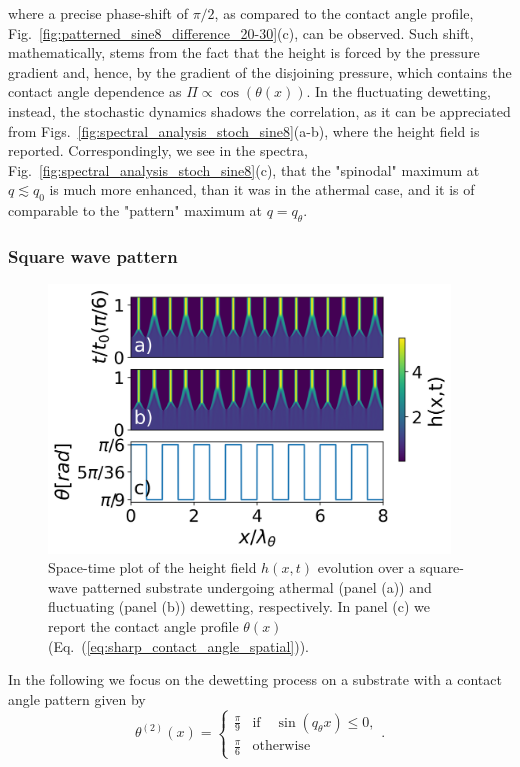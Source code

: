 where a precise phase-shift of $\pi/2$, as compared to the contact angle profile,  Fig.~\ref{fig:patterned_sine8_difference_20-30}(c), can be observed. Such
shift, mathematically, stems from the fact that the height is forced by the pressure gradient and, hence, by the gradient of the disjoining pressure, which contains the contact angle dependence as $\Pi \propto \cos(\theta(x))$.
In the fluctuating dewetting, instead, the stochastic dynamics shadows the correlation,
as it can be appreciated from Figs.~\ref{fig:spectral_analysis_stoch_sine8}(a-b), where 
the height field is reported. 
Correspondingly, we see in the spectra, Fig.~\ref{fig:spectral_analysis_stoch_sine8}(c), 
that the "spinodal" maximum at $q \lesssim q_0$ is much more enhanced, than it was in the athermal case, and it is of comparable to the "pattern" maximum at $q = q_{\theta}$.
\subsubsection{Square wave pattern}\label{subsubsec:square_wave}
\begin{figure}
    \centering
    \includegraphics[width=0.95\textwidth]{graphics/spacedepCA_['delta', '1e7', '10', 25, '9_3', 2000000.0]_v2.png}
    \caption{Space-time plot of the height field $h(x,t)$ evolution over a square-wave patterned substrate undergoing athermal 
    (panel (a)) and fluctuating (panel (b)) dewetting, respectively. In panel (c) we report the contact angle profile $\theta(x)$ (Eq.~(\ref{eq:sharp_contact_angle_spatial})).} 
    \label{fig:patterned_step8_difference_20-30}
\end{figure}
In the following we focus on the dewetting process on a substrate with a contact angle pattern given by 
\begin{equation}\label{eq:sharp_contact_angle_spatial}
    {\theta^{(2)}(x)} = 
    \left\{
    \begin{array}{ll}
        \frac{\pi}{9} & \text{if} \quad\sin(q_{\theta}x) \leq 0, \\
        \frac{\pi}{6} & \text{otherwise}
    \end{array}
    \right..
\end{equation}

